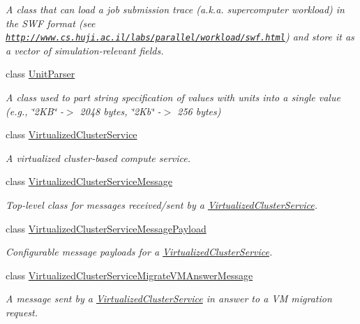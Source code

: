 \begin{DoxyCompactItemize}
\begin{DoxyCompactList}\small\item\em A class that can load a job submission trace (a.\+k.\+a. supercomputer workload) in the S\+WF format (see \href{http://www.cs.huji.ac.il/labs/parallel/workload/swf.html}{\tt http\+://www.\+cs.\+huji.\+ac.\+il/labs/parallel/workload/swf.\+html}) and store it as a vector of simulation-\/relevant fields. \end{DoxyCompactList}\item 
class \hyperlink{classwrench_1_1_unit_parser}{Unit\+Parser}
\begin{DoxyCompactList}\small\item\em A class used to part string specification of values with units into a single value (e.\+g., \char`\"{}2\+K\+B\char`\"{} -\/$>$ 2048 bytes, \char`\"{}2\+Kb\char`\"{} -\/$>$ 256 bytes) \end{DoxyCompactList}\item 
class \hyperlink{classwrench_1_1_virtualized_cluster_service}{Virtualized\+Cluster\+Service}
\begin{DoxyCompactList}\small\item\em A virtualized cluster-\/based compute service. \end{DoxyCompactList}\item 
class \hyperlink{classwrench_1_1_virtualized_cluster_service_message}{Virtualized\+Cluster\+Service\+Message}
\begin{DoxyCompactList}\small\item\em Top-\/level class for messages received/sent by a \hyperlink{classwrench_1_1_virtualized_cluster_service}{Virtualized\+Cluster\+Service}. \end{DoxyCompactList}\item 
class \hyperlink{classwrench_1_1_virtualized_cluster_service_message_payload}{Virtualized\+Cluster\+Service\+Message\+Payload}
\begin{DoxyCompactList}\small\item\em Configurable message payloads for a \hyperlink{classwrench_1_1_virtualized_cluster_service}{Virtualized\+Cluster\+Service}. \end{DoxyCompactList}\item 
class \hyperlink{classwrench_1_1_virtualized_cluster_service_migrate_v_m_answer_message}{Virtualized\+Cluster\+Service\+Migrate\+V\+M\+Answer\+Message}
\begin{DoxyCompactList}\small\item\em A message sent by a \hyperlink{classwrench_1_1_virtualized_cluster_service}{Virtualized\+Cluster\+Service} in answer to a VM migration request. \end{DoxyCompactList}\item 

\end{DoxyCompactItemize}
